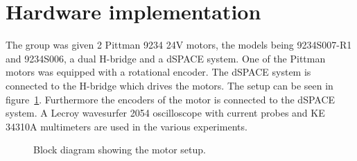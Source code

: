 \section{Hardware implementation}
The group was given 2 Pittman 9234 24V motors, the models being 9234S007-R1 and 9234S006, a dual H-bridge and a dSPACE system.
One of the Pittman motors was equipped with a rotational encoder.
The dSPACE system is connected to the H-bridge which drives the motors. 
The setup can be seen in figure~\ref{fig:implementation_block}.
Furthermore the encoders of the motor is connected to the dSPACE system.
A Lecroy wavesurfer 2054 oscilloscope with current probes and KE 34310A multimeters are used in the various experiments.

\begin{figure}[!h]
\centering

  \caption{Block diagram showing the motor setup.}
  \label{fig:implementation_block}
\end{figure}

